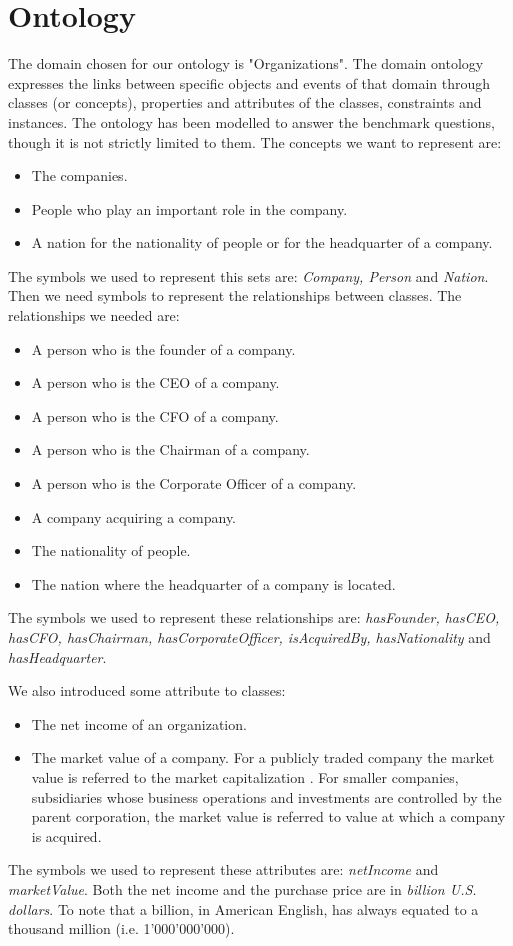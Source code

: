 \section{Ontology}
\label{sec:ontology}
The domain chosen for our ontology is "Organizations". The domain ontology expresses the links between specific objects and events of that domain through classes (or concepts), properties and attributes of the classes, constraints and instances. The ontology has been modelled to answer the benchmark questions, though it is not strictly limited to them.
The concepts we want to represent are:
\begin{itemize}
\item The companies.
\item People who play an important role in the company.
\item A nation for the nationality of people or for the headquarter of a company.
\end{itemize}
The symbols we used to represent this sets are: \textit{Company, Person} and \textit{Nation}.
Then we need symbols to represent the relationships between classes. The relationships we needed are:
\begin{itemize}
\item A person who is the founder of a company.
\item A person who is the CEO of a company.
\item A person who is the CFO of a company.
\item A person who is the Chairman of a company.
\item A person who is the Corporate Officer of a company.
\item A company acquiring a company.
\item The nationality of people.
\item The nation where the headquarter of a company is located.
\end{itemize}
The symbols we used to represent these relationships are: \textit{hasFounder, hasCEO, hasCFO, hasChairman, hasCorporateOfficer, isAcquiredBy, hasNationality} and \textit{hasHeadquarter}. 

We also introduced some attribute to classes:
\begin{itemize}
\item The net income of an organization.
\item The market value of a company. For a publicly traded company the market
value is referred to the market capitalization \cite{marketCap}. For
smaller companies, subsidiaries whose business operations and investments are controlled by the parent corporation, the market value is referred to value at which a company is acquired.
\end{itemize}
The symbols we used to represent these attributes are: \textit{ netIncome} and \textit{marketValue}.
Both the net income and the purchase price are in \textit{billion U.S. dollars}. To note that a billion, in American English, has always equated to a thousand million (i.e. 1'000'000'000).

